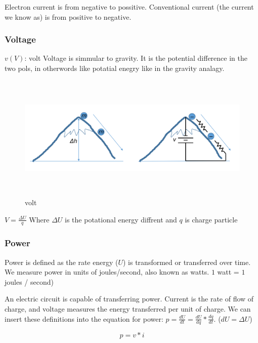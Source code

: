 Electron current is from negative to possitive. Conventional current (the current we know as) is from
positive to negative.

\subsubsection{Voltage}
$v (V)$: volt \newline
Voltage is simmular to gravity. It is the potential difference in the two pols, in otherwords
like potatial enegry like in the gravity analagy.

\begin{figure}[h]
    \vspace{10mm}
    \centering
    \includegraphics[width=15cm, height=6cm]{image/volt.png}
    \caption{volt}
\end{figure}

$V=\frac{\Delta{U}}{q}$ Where $\Delta{U}$ is the potational energy diffrent and $q$ is charge particle

\newpage
\subsubsection{Power}
Power is defined as the rate energy ($U$) is transformed or transferred over time. We measure power in units of joules/second, also known as watts.
$1$ watt = $1$ joules / second) \newline

An electric circuit is capable of transferring power. Current is the rate of flow of charge, and voltage measures the energy transferred per unit of charge. We can insert these definitions into the equation for power:
$p = \frac{dU}{dt} = \frac{dU}{dq} * \frac{dq}{dt}$. ($dU=\Delta{U}$)

\begin{equation} p = v*i \end{equation}

